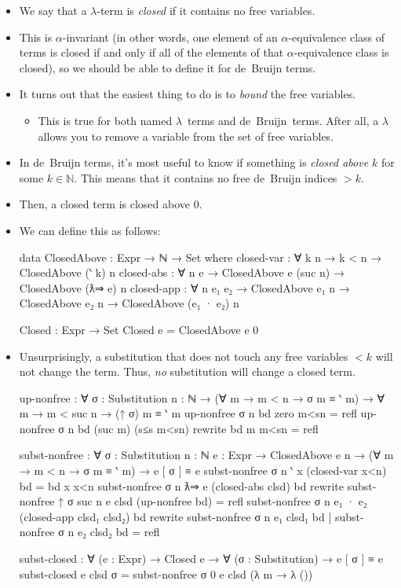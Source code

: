 \documentclass{lecturenotes}
\begin{document}
\begin{itemize}
\item We say that a $\lambda$-term is \emph{closed} if it contains no free variables.
\item This is $\alpha$-invariant (in other words, one element of an $\alpha$-equivalence class of terms is closed if and only if all of the elements of that $\alpha$-equivalence class is closed), so we should be able to define it for de~Bruijn terms.
\item It turns out that the easiest thing to do is to \emph{bound} the free variables.
  \begin{itemize}
  \item This is true for both named $\lambda$~terms and de~Bruijn~terms.
    After all, a $\lambda$ allows you to remove a variable from the set of free variables.
  \end{itemize}
\item In de~Bruijn terms, it's most useful to know if something is \emph{closed above $k$} for some $k \in \mathbb{N}$.
  This means that it contains no free de~Bruijn indices $> k$.
\item Then, a closed term is closed above $0$.
\item We can define this as follows:
\begin{code}
data ClosedAbove : Expr → ℕ → Set where
  closed-var : ∀ {k n} → k < n → ClosedAbove (‵ k) n
  closed-abs : ∀ {n e} → ClosedAbove e (suc n) → ClosedAbove (ƛ⇒ e) n
  closed-app : ∀ {n e₁ e₂} → ClosedAbove e₁ n → ClosedAbove e₂ n → ClosedAbove (e₁ · e₂) n

Closed : Expr → Set
Closed e = ClosedAbove e 0    
\end{code}
\item Unsurprisingly, a substitution that does not touch any free variables $< k$ will not change the term.
  Thus, \emph{no} substitution will change a closed term.
\begin{code}
up-nonfree : ∀ {σ : Substitution} {n : ℕ} → 
  (∀ m → m < n → σ m ≡ ‵ m) →
  ∀ m → m < suc n → (↑ σ) m ≡ ‵ m
up-nonfree {σ} {n} bd zero m<sn = refl
up-nonfree {σ} {n} bd (suc m) (s≤s m<sn) rewrite bd m m<sn = refl

subst-nonfree : ∀ {σ : Substitution} {n : ℕ} {e : Expr} →
  ClosedAbove e n →
  (∀ m → m < n → σ m ≡ ‵ m) →
  e [ σ ] ≡ e
subst-nonfree {σ} {n} {‵ x} (closed-var x<n) bd = bd x x<n
subst-nonfree {σ} {n} {ƛ⇒ e} (closed-abs clsd) bd rewrite subst-nonfree {↑ σ} {suc n} {e} clsd (up-nonfree bd) = refl
subst-nonfree {σ} {n} {e₁ · e₂} (closed-app clsd₁ clsd₂) bd rewrite subst-nonfree {σ} {n} {e₁} clsd₁ bd | subst-nonfree {σ} {n} {e₂} clsd₂ bd = refl

subst-closed : ∀ (e : Expr) → Closed e → ∀ (σ : Substitution) → e [ σ ] ≡ e
subst-closed e clsd σ = subst-nonfree {σ} {0} {e} clsd (λ m → λ ())
\end{code}
\end{itemize}
\end{document}
